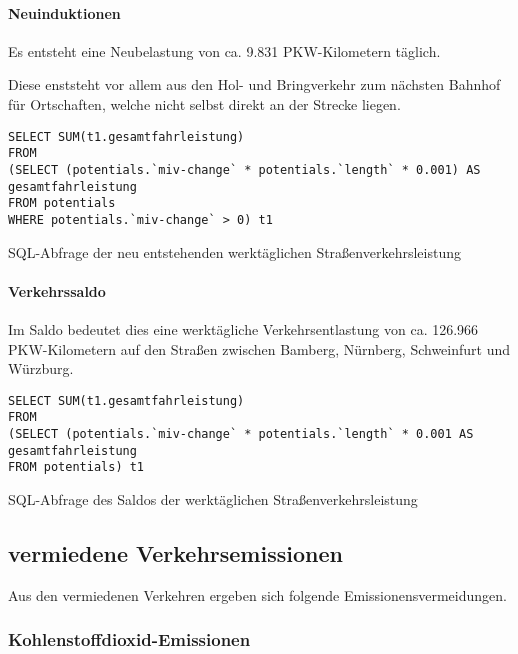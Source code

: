 \documentclass[fontsize=12pt,a4paper]{scrreprt}
\begin{document}
\paragraph{Neuinduktionen}
Es entsteht eine Neubelastung von ca. 9.831 PKW-Kilometern täglich.

Diese enststeht vor allem aus den Hol- und Bringverkehr zum nächsten Bahnhof für Ortschaften, welche nicht selbst direkt an der Strecke liegen.

\begin{listing}[htbp]
        \begin{verbatim}
SELECT SUM(t1.gesamtfahrleistung)  
FROM
(SELECT (potentials.`miv-change` * potentials.`length` * 0.001) AS gesamtfahrleistung
FROM potentials
WHERE potentials.`miv-change` > 0) t1
\end{verbatim}
        \caption{SQL-Abfrage der neu entstehenden werktäglichen Straßenverkehrsleistung}\label{lst-neu-werktaeglich}
\end{listing}

\paragraph{Verkehrssaldo}

Im Saldo bedeutet dies eine werktägliche Verkehrsentlastung von ca. 126.966 PKW-Kilometern auf den Straßen zwischen Bamberg, Nürnberg, Schweinfurt und Würzburg.

\begin{listing}[htbp]
        \begin{verbatim}
SELECT SUM(t1.gesamtfahrleistung)  
FROM
(SELECT (potentials.`miv-change` * potentials.`length` * 0.001 AS gesamtfahrleistung
FROM potentials) t1
\end{verbatim}
        \caption{SQL-Abfrage des Saldos der werktäglichen Straßenverkehrsleistung}\label{lst-neu-werktaeglich-saldo}
\end{listing}

\subsection{vermiedene Verkehrsemissionen}

Aus den vermiedenen Verkehren ergeben sich folgende Emissionensvermeidungen.

\subsubsection{Kohlenstoffdioxid-Emissionen}
\end{document}
